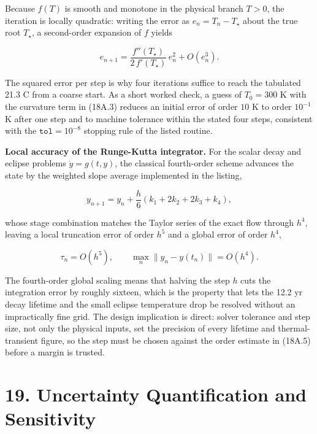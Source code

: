\documentclass[
  11pt,
  openany,
  oneside]{book}
\begin{document}
Because \(f(T)\) is smooth and monotone in the physical branch \(T>0\),
the iteration is locally quadratic: writing the error as
\(e_n = T_n - T_\star\) about the true root \(T_\star\), a second-order
expansion of \(f\) yields

\begin{equation}
e_{n+1} = \frac{f''(T_\star)}{2\,f'(T_\star)}\, e_n^2 + O(e_n^3). \tag{18A.3}
\end{equation}

The squared error per step is why four iterations suffice to reach the
tabulated 21.3 C from a coarse start. As a short worked check, a guess
of \(T_0 = 300\) K with the curvature term in (18A.3) reduces an initial
error of order \(10\) K to order \(10^{-1}\) K after one step and to
machine tolerance within the stated four steps, consistent with the
\(\mathtt{tol}=10^{-8}\) stopping rule of the listed routine.

\textbf{Local accuracy of the Runge-Kutta integrator.} For the scalar
decay and eclipse problems \(\dot{y}=g(t,y)\), the classical
fourth-order scheme advances the state by the weighted slope average
implemented in the listing,

\begin{equation}
y_{n+1} = y_n + \frac{h}{6}\left( k_1 + 2k_2 + 2k_3 + k_4 \right), \tag{18A.4}
\end{equation}

whose stage combination matches the Taylor series of the exact flow
through \(h^4\), leaving a local truncation error of order \(h^5\) and a
global error of order \(h^4\),

\begin{equation}
\tau_{n} = O(h^5), \qquad \max_n \lVert y_n - y(t_n) \rVert = O(h^4). \tag{18A.5}
\end{equation}

The fourth-order global scaling means that halving the step \(h\) cuts
the integration error by roughly sixteen, which is the property that
lets the 12.2 yr decay lifetime and the small eclipse temperature drop
be resolved without an impractically fine grid. The design implication
is direct: solver tolerance and step size, not only the physical inputs,
set the precision of every lifetime and thermal-transient figure, so the
step must be chosen against the order estimate in (18A.5) before a
margin is trusted.

\chapter{19. Uncertainty Quantification and
Sensitivity}\label{uncertainty-quantification-and-sensitivity}
\end{document}
